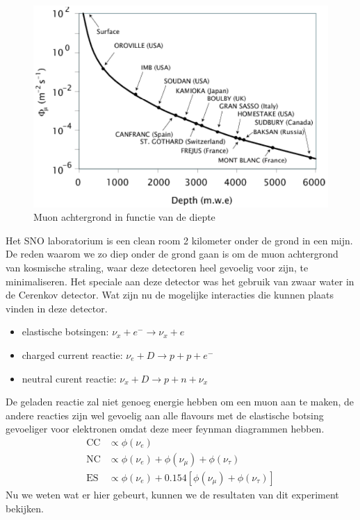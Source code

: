 \documentclass[../main.tex]{subfiles}
\begin{document}
\begin{figure}[h]
    \centering
    \includegraphics[width=0.5\linewidth]{neutrinos/muon_achtergrond_verval.png}
    \caption{Muon achtergrond in functie van de diepte}%
    \label{fig:neutrinos/muon_achtergrond_verval}
\end{figure}

Het SNO laboratorium is een clean room 2 kilometer onder de grond in een mijn. De reden waarom we zo diep onder de grond gaan is om de muon achtergrond van kosmische straling, waar deze detectoren heel gevoelig voor zijn, te minimaliseren. Het speciale aan deze detector was het gebruik van zwaar water in de Cerenkov detector. Wat zijn nu de mogelijke interacties die kunnen plaats vinden in deze detector.
\begin{itemize}
    \item elastische botsingen: $\nu_{x}+e^{-} \rightarrow \nu_{x}+e$
    \item charged current reactie: $\nu_{e}+D \rightarrow p+p+e^{-}$
    \item neutral curent reactie: $\nu_{x}+D \rightarrow p+n+\nu_{x}$
\end{itemize}
De geladen reactie zal niet genoeg energie hebben om een muon aan te maken, de andere reacties zijn wel gevoelig aan alle flavours met de elastische botsing gevoeliger voor elektronen omdat deze meer feynman diagrammen hebben.
\begin{equation}
    \begin{aligned}
        \label{eq:sno_flavour_gevoeligheid}
        \mathrm{CC} &\propto \phi\left(\nu_{e}\right) \\
        \mathrm{NC} &\propto \phi\left(\nu_{e}\right)+\phi\left(\nu_{\mu}\right)+\phi\left(\nu_{\tau}\right) \\
        \mathrm{ES} &\propto \phi\left(\nu_{e}\right)+0.154\left[\phi\left(\nu_{\mu}\right)+\phi\left(\nu_{\tau}\right)\right]
    \end{aligned}
\end{equation}
Nu we weten wat er hier gebeurt, kunnen we de resultaten van dit experiment bekijken.
\end{document}
